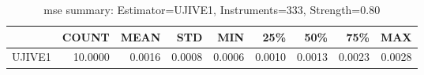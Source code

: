 \begin{table}[ht]
\centering
\caption{mse summary: Estimator=UJIVE1, Instruments=333, Strength=0.80}
\begin{tabular}{lrrrrrrrr}
\toprule
 & COUNT & MEAN & STD & MIN & 25\% & 50\% & 75\% & MAX \\
\midrule
UJIVE1 & 10.0000 & 0.0016 & 0.0008 & 0.0006 & 0.0010 & 0.0013 & 0.0023 & 0.0028 \\
\bottomrule
\end{tabular}
\end{table}
